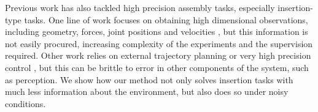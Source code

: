 Previous work has also tackled high precision assembly tasks, especially insertion-type tasks. One line of work focuses on obtaining high dimensional observations, including geometry, forces, joint positions and velocities \cite{li2014usbgelsight, tamar2017hindsightplan, inoue2017deeprlassembly, luo19variableimpedance}, but this information is not easily procured, increasing complexity of the experiments and the supervision required. Other work relies on external trajectory planning or very high precision control \cite{inoue2017deeprlassembly, tamar2017hindsightplan}, but this can be brittle to error in other components of the system, such as perception. We show how our method not only solves insertion tasks with much less information about the environment, but also does so under noisy conditions.